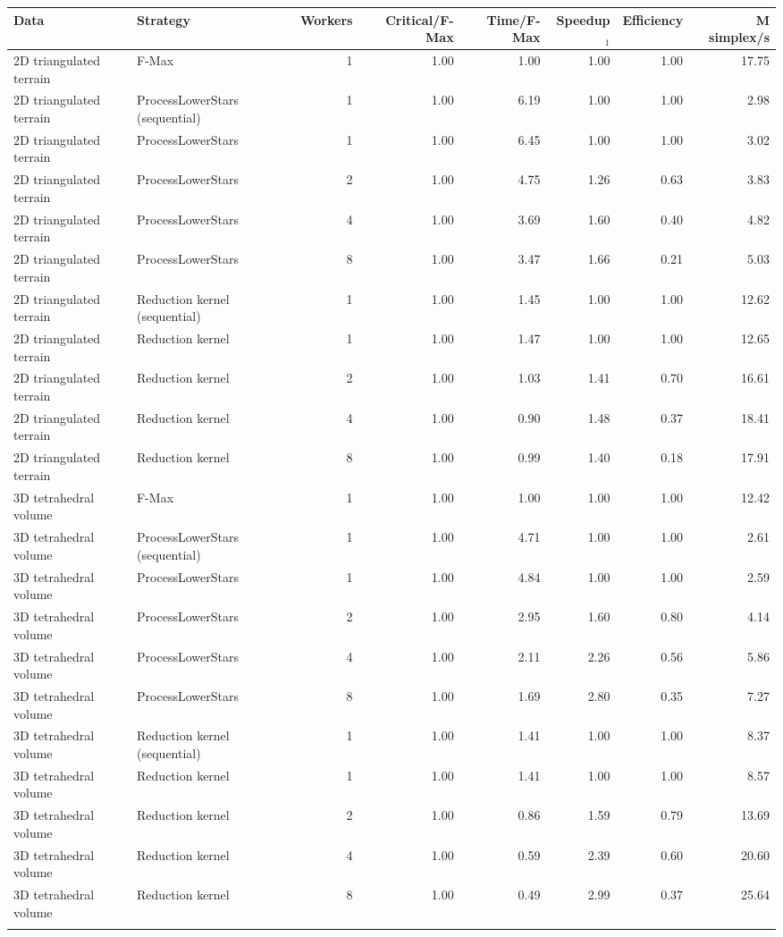 \begin{tabular}{llrrrrrr}
\toprule
Data & Strategy & Workers & Critical/F-Max & Time/F-Max & Speedup$_1$ & Efficiency & M simplex/s \\
\midrule
2D triangulated terrain & F-Max & 1 & 1.00 & 1.00 & 1.00 & 1.00 & 17.75 \\
2D triangulated terrain & ProcessLowerStars (sequential) & 1 & 1.00 & 6.19 & 1.00 & 1.00 & 2.98 \\
2D triangulated terrain & ProcessLowerStars & 1 & 1.00 & 6.45 & 1.00 & 1.00 & 3.02 \\
2D triangulated terrain & ProcessLowerStars & 2 & 1.00 & 4.75 & 1.26 & 0.63 & 3.83 \\
2D triangulated terrain & ProcessLowerStars & 4 & 1.00 & 3.69 & 1.60 & 0.40 & 4.82 \\
2D triangulated terrain & ProcessLowerStars & 8 & 1.00 & 3.47 & 1.66 & 0.21 & 5.03 \\
2D triangulated terrain & Reduction kernel (sequential) & 1 & 1.00 & 1.45 & 1.00 & 1.00 & 12.62 \\
2D triangulated terrain & Reduction kernel & 1 & 1.00 & 1.47 & 1.00 & 1.00 & 12.65 \\
2D triangulated terrain & Reduction kernel & 2 & 1.00 & 1.03 & 1.41 & 0.70 & 16.61 \\
2D triangulated terrain & Reduction kernel & 4 & 1.00 & 0.90 & 1.48 & 0.37 & 18.41 \\
2D triangulated terrain & Reduction kernel & 8 & 1.00 & 0.99 & 1.40 & 0.18 & 17.91 \\
\addlinespace
3D tetrahedral volume & F-Max & 1 & 1.00 & 1.00 & 1.00 & 1.00 & 12.42 \\
3D tetrahedral volume & ProcessLowerStars (sequential) & 1 & 1.00 & 4.71 & 1.00 & 1.00 & 2.61 \\
3D tetrahedral volume & ProcessLowerStars & 1 & 1.00 & 4.84 & 1.00 & 1.00 & 2.59 \\
3D tetrahedral volume & ProcessLowerStars & 2 & 1.00 & 2.95 & 1.60 & 0.80 & 4.14 \\
3D tetrahedral volume & ProcessLowerStars & 4 & 1.00 & 2.11 & 2.26 & 0.56 & 5.86 \\
3D tetrahedral volume & ProcessLowerStars & 8 & 1.00 & 1.69 & 2.80 & 0.35 & 7.27 \\
3D tetrahedral volume & Reduction kernel (sequential) & 1 & 1.00 & 1.41 & 1.00 & 1.00 & 8.37 \\
3D tetrahedral volume & Reduction kernel & 1 & 1.00 & 1.41 & 1.00 & 1.00 & 8.57 \\
3D tetrahedral volume & Reduction kernel & 2 & 1.00 & 0.86 & 1.59 & 0.79 & 13.69 \\
3D tetrahedral volume & Reduction kernel & 4 & 1.00 & 0.59 & 2.39 & 0.60 & 20.60 \\
3D tetrahedral volume & Reduction kernel & 8 & 1.00 & 0.49 & 2.99 & 0.37 & 25.64 \\
\addlinespace
\bottomrule
\end{tabular}
